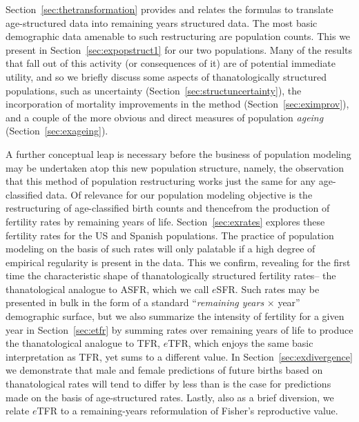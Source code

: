 Section~\ref{sec:thetransformation} provides and relates the formulas to
translate age-structured data into remaining years structured data. The most
basic demographic data amenable to such restructuring are population counts.
This we present in Section~\ref{sec:expopstruct1} for our two populations.
Many of the results that fall out of this activity (or consequences of it) are
of potential immediate utility, and so we briefly discuss some aspects of
thanatologically structured populations, such as uncertainty
(Section~\ref{sec:structuncertainty}), the incorporation of mortality
improvements in the method (Section~\ref{sec:eximprov}), and a couple of
the more obvious and direct measures of population \textit{ageing}
(Section~\ref{sec:exageing}).

A further conceptual leap is necessary before the business of population
modeling may be undertaken atop this new population structure, namely, the
observation that this method of population restructuring works just the same for any age-classified data. Of
relevance for our population modeling objective is the restructuring of
age-classified birth counts and thencefrom the production of fertility rates by
remaining years of life. Section~\ref{sec:exrates} explores these fertility
rates for the US and Spanish populations. The practice of population modeling
on the basis of such rates will only palatable if a high degree of empirical
regularity is present in the data. This we confirm, revealing for the first
time the characteristic shape of thanatologically structured fertility rates--
the thanatological analogue to ASFR, which we call $e$SFR. Such rates may be
presented in bulk in the form of a standard ``\textit{remaining years} $\times$
year'' demographic surface, but we also summarize the intensity of fertility
for a given year in Section~\ref{sec:etfr} by summing rates over remaining years of life to produce
the thanatological analogue to TFR, $e$TFR, which enjoys the
same basic interpretation as TFR, yet sums to a different value. In
Section~\ref{sec:exdivergence} we demonstrate that male and female predictions
of future births based on thanatological rates will tend to differ by less than 
is the case for predictions made on the basis of age-structured rates. Lastly,
also as a brief diversion, we relate $e$TFR to a remaining-years reformulation
of Fisher's reproductive value.

